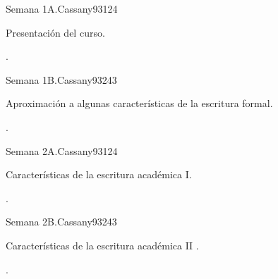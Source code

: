 \begin{syllabus}
\begin{competences}
    \item {}
    \item {}
    \item {}
\end{competences}

\begin{unit}{Semana 1A.}{}{Cassany93}{12}{4}
   \begin{topics}
      \item Presentación del curso.
   \end{topics}
   \begin{learningoutcomes}
      \item .
   \end{learningoutcomes}
\end{unit}

\begin{unit}{Semana 1B.}{}{Cassany93}{24}{3}
   \begin{topics}
      \item Aproximación a algunas características de la escritura formal.
   \end{topics}

   \begin{learningoutcomes}
      \item .
      \end{learningoutcomes}
\end{unit}

\begin{unit}{Semana 2A.}{}{Cassany93}{12}{4}
   \begin{topics}
      \item Características de la escritura académica I.
   \end{topics}
   \begin{learningoutcomes}
      \item .
   \end{learningoutcomes}
\end{unit}

\begin{unit}{Semana 2B.}{}{Cassany93}{24}{3}
   \begin{topics}
      \item Características de la escritura académica II .
   \end{topics}

   \begin{learningoutcomes}
      \item . 
   \end{learningoutcomes}
\end{unit}


\end{syllabus}
